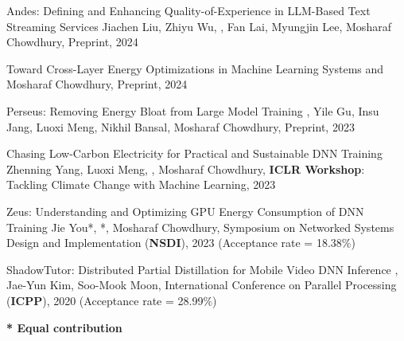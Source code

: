 

\begin{cvlist}

  \cvlistitem
    {Andes: Defining and Enhancing Quality-of-Experience in LLM-Based Text Streaming Services} %
    {Jiachen Liu, Zhiyu Wu, , Fan Lai, Myungjin Lee, Mosharaf Chowdhury, Preprint, 2024} %

  \cvlistitem
    {Toward Cross-Layer Energy Optimizations in Machine Learning Systems} %
    { and Mosharaf Chowdhury, Preprint, 2024} %

  \cvlistitem
    {Perseus: Removing Energy Bloat from Large Model Training} %
    {, Yile Gu, Insu Jang, Luoxi Meng, Nikhil Bansal, Mosharaf Chowdhury, Preprint, 2023} %

  \cvlistitem
    {Chasing Low-Carbon Electricity for Practical and Sustainable DNN Training} %
    {Zhenning Yang, Luoxi Meng, , Mosharaf Chowdhury, \textbf{ICLR Workshop}: Tackling Climate Change with Machine Learning, 2023} %

  \cvlistitem
    {Zeus: Understanding and Optimizing GPU Energy Consumption of DNN Training} %
    {Jie You*, *, Mosharaf Chowdhury, Symposium on Networked Systems Design and Implementation (\textbf{NSDI}), 2023 (Acceptance rate = 18.38\%)} %

  \cvlistitem
    {ShadowTutor: Distributed Partial Distillation for Mobile Video DNN Inference} %
    {, Jae-Yun Kim, Soo-Mook Moon, International Conference on Parallel Processing (\textbf{ICPP}), 2020 (Acceptance rate = 28.99\%)} %

\end{cvlist}

\vspace{-5mm}
\begin{cvparagraph}
  \textbf{* Equal contribution}
\end{cvparagraph}
